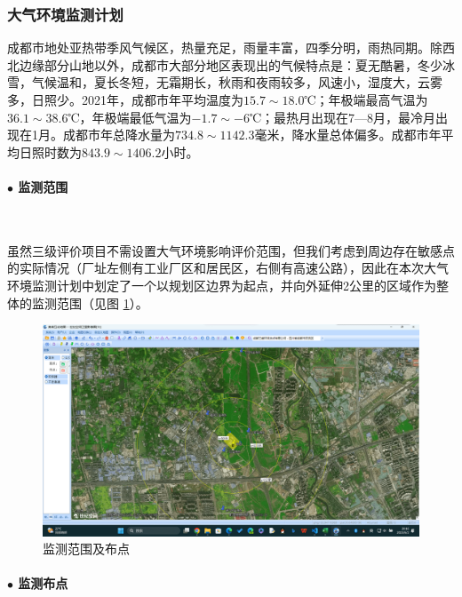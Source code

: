 \subsubsection{大气环境监测计划}
成都市地处亚热带季风气候区，热量充足，雨量丰富，四季分明，雨热同期。除西北边缘部分山地以外，成都市大部分地区表现出的气候特点是：夏无酷暑，冬少冰雪，气候温和，夏长冬短，无霜期长，秋雨和夜雨较多，风速小，湿度大，云雾多，日照少。2021年，成都市年平均温度为$15.7\sim 18.0$℃；年极端最高气温为$36.1\sim 38.6$℃，年极端最低气温为$-1.7\sim -6$℃；最热月出现在7—8月，最冷月出现在1月。成都市年总降水量为$734.8\sim 1142.3$毫米，降水量总体偏多。成都市年平均日照时数为$843.9\sim 1406.2$小时。
\cite{成都气候特点}


\paragraph{$\bullet$ 监测范围}~{}\par
虽然三级评价项目不需设置大气环境影响评价范围\cite{HJ2.2-2018}，但我们考虑到周边存在敏感点的实际情况（厂址左侧有工业厂区和居民区，右侧有高速公路），因此在本次大气环境监测计划中划定了一个以规划区边界为起点，并向外延伸2公里的区域作为整体的监测范围（见图 \ref{fig:Monitoring range and distribution map}）。

\begin{figure}[H]
    \centering
    \includegraphics[width=\textwidth]{figures/Monitoring range and distribution map.png}
    \caption{监测范围及布点}
    \label{fig:Monitoring range and distribution map}
\end{figure}


\paragraph{$\bullet$ 监测布点}~{}\par

